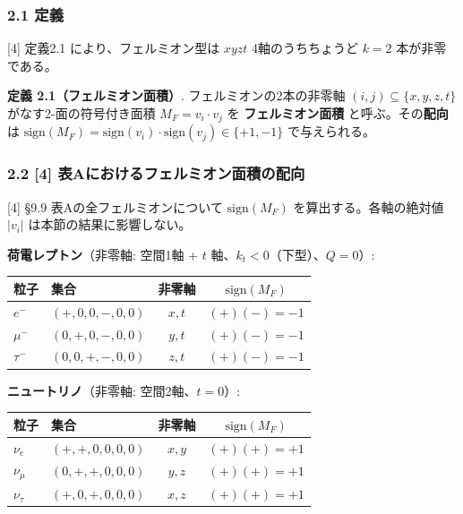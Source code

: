 \documentclass[
  a4paper,11pt]{ltjsarticle}
\newcounter{none} %
\begin{document}
\subsubsection{2.1 定義}\label{ux5b9aux7fa9}

{[}4{]} 定義2.1 により、フェルミオン型は \(xyzt\) 4軸のうちちょうど
\(k = 2\) 本が非零である。

\textbf{定義 2.1（フェルミオン面積）}. フェルミオンの2本の非零軸
\((i, j) \subseteq \{x, y, z, t\}\) がなす2-面の符号付き面積
\(M_F = v_i \cdot v_j\) を \textbf{フェルミオン面積}
と呼ぶ。その\textbf{配向}は
\(\text{sign}(M_F) = \text{sign}(v_i) \cdot \text{sign}(v_j) \in \{+1, -1\}\)
で与えられる。

\subsubsection{2.2 {[}4{]}
表Aにおけるフェルミオン面積の配向}\label{ux8868aux306bux304aux3051ux308bux30d5ux30a7ux30ebux30dfux30aaux30f3ux9762ux7a4dux306eux914dux5411}

{[}4{]} §9.9 表Aの全フェルミオンについて \(\text{sign}(M_F)\)
を算出する。各軸の絶対値 \(|v_i|\) は本節の結果に影響しない。

\textbf{荷電レプトン}（非零軸: 空間1軸 + \(t\)
軸、\(k_t < 0\)（下型）、\(Q = 0\)）:

{\def\LTcaptype{none} %
\begin{longtable}[]{@{}llcc@{}}
\toprule\noalign{}
粒子 & 集合 & 非零軸 & \(\text{sign}(M_F)\) \\
\midrule\noalign{}
\endhead
\bottomrule\noalign{}
\endlastfoot
\(e^-\) & \((+, 0, 0, -, 0, 0)\) & \(x, t\) & \((+)(-)= -1\) \\
\(\mu^-\) & \((0, +, 0, -, 0, 0)\) & \(y, t\) & \((+)(-)= -1\) \\
\(\tau^-\) & \((0, 0, +, -, 0, 0)\) & \(z, t\) & \((+)(-)= -1\) \\
\end{longtable}
}

\textbf{ニュートリノ}（非零軸: 空間2軸、\(t = 0\)）:

{\def\LTcaptype{none} %
\begin{longtable}[]{@{}llcc@{}}
\toprule\noalign{}
粒子 & 集合 & 非零軸 & \(\text{sign}(M_F)\) \\
\midrule\noalign{}
\endhead
\bottomrule\noalign{}
\endlastfoot
\(\nu_e\) & \((+, +, 0, 0, 0, 0)\) & \(x, y\) & \((+)(+)= +1\) \\
\(\nu_\mu\) & \((0, +, +, 0, 0, 0)\) & \(y, z\) & \((+)(+)= +1\) \\
\(\nu_\tau\) & \((+, 0, +, 0, 0, 0)\) & \(x, z\) & \((+)(+)= +1\) \\
\end{longtable}
}
\end{document}
